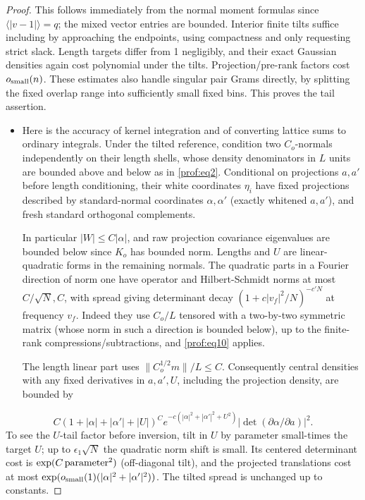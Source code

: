 \begin{proof}
This follows immediately from the normal moment formulas since \(\langle|v-1|\rangle=q\); the mixed vector entries are bounded. Interior finite tilts suffice including by approaching the endpoints, using compactness and only requesting strict slack. Length targets differ from 1 negligibly, and their exact Gaussian densities again cost polynomial under the tilts. Projection/pre-rank factors cost \(o_{\rm small}(n)\). These estimates also handle singular pair Grams directly, by splitting the fixed overlap range into sufficiently small fixed bins. This proves the tail assertion.

\begin{itemize}
\item Here is the accuracy of kernel integration and of converting lattice sums to ordinary integrals. Under the tilted reference, condition two \(C_o\)-normals independently on their length shells, whose density denominators in \(L\) units are bounded above and below as in \eqref{prof:eq2}. Conditional on projections \(a,a'\) before length conditioning, their white coordinates \(\eta_i\) have fixed projections described by standard-normal coordinates \(\alpha,\alpha'\) (exactly whitened \(a,a'\)), and fresh standard orthogonal complements.

In particular \(|W|\le C|\alpha|\), and raw projection covariance eigenvalues are bounded below since \(K_o\) has bounded norm. Lengths and \(U\) are linear-quadratic forms in the remaining normals. The quadratic parts in a Fourier direction of norm one have operator and Hilbert-Schmidt norms at most \(C/\sqrt N,C\), with spread giving determinant decay \((1+c |v_f|^2/N)^{-c'N}\) at frequency \(v_f\). Indeed they use \(C_o/L\) tensored with a two-by-two symmetric matrix (whose norm in such a direction is bounded below), up to the finite-rank compressions/subtractions, and \eqref{prof:eq10} applies.

The length linear part uses \(\|C_o^{1/2}m\|/L\le C\). Consequently central densities with any fixed derivatives in \(a,a',U\), including the projection density, are bounded by
\end{itemize}
\begin{equation}\label{prof:eq18}
C(1+|\alpha|+|\alpha'|+|U|)^C e^{-c(|\alpha|^2+|\alpha'|^2+U^2)}
 \big|\det(\partial\alpha/\partial a)\big|^2 .
\end{equation}
To see the \(U\)-tail factor before inversion, tilt in \(U\) by parameter small-times the target \(U\); up to \(\epsilon_1\sqrt N\) the quadratic norm shift is small. Its centered determinant cost is \(\exp(C\,{\rm parameter}^2)\) (off-diagonal tilt), and the projected translations cost at most \(\exp(o_{\rm small}(1)(|\alpha|^2+|\alpha'|^2))\). The tilted spread is unchanged up to constants.


\end{proof}
